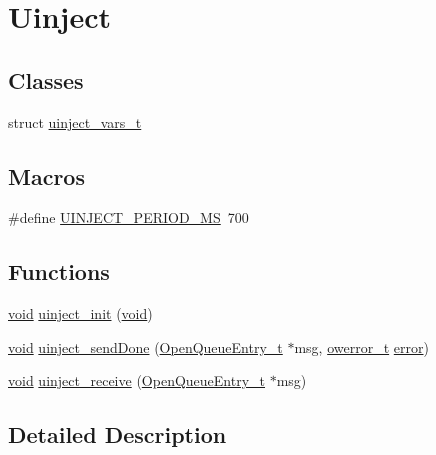 \hypertarget{group__uinject}{}\section{Uinject}
\label{group__uinject}
\subsection*{Classes}
\begin{DoxyCompactItemize}
\item 
struct \hyperlink{structuinject__vars__t}{uinject\+\_\+vars\+\_\+t}
\end{DoxyCompactItemize}
\subsection*{Macros}
\begin{DoxyCompactItemize}
\item 
\#define \hyperlink{group__uinject_ga5b31a0d33a0be3a28d77fbdba9a3e2b7}{U\+I\+N\+J\+E\+C\+T\+\_\+\+P\+E\+R\+I\+O\+D\+\_\+\+MS}~700
\end{DoxyCompactItemize}
\subsection*{Functions}
\begin{DoxyCompactItemize}
\item 
\hyperlink{usb__devapi_8h_afabf60e7f57651d6d595a02c75f07cd0}{void} \hyperlink{group__uinject_gac6dcaebf6fba84d30d183c304c65040e}{uinject\+\_\+init} (\hyperlink{usb__devapi_8h_afabf60e7f57651d6d595a02c75f07cd0}{void})
\item 
\hyperlink{usb__devapi_8h_afabf60e7f57651d6d595a02c75f07cd0}{void} \hyperlink{group__uinject_gacd746c671f588346d03cd1fcf3d9d1b7}{uinject\+\_\+send\+Done} (\hyperlink{struct_open_queue_entry__t}{Open\+Queue\+Entry\+\_\+t} $\ast$msg, \hyperlink{opendefs_8h_af20b7c3ed9d2ba19e56a309ad9314803}{owerror\+\_\+t} \hyperlink{disk_8c_ad018a3100b2dabad325a0800152db297}{error})
\item 
\hyperlink{usb__devapi_8h_afabf60e7f57651d6d595a02c75f07cd0}{void} \hyperlink{group__uinject_gab4b19f3980fe96992594b407e7a78752}{uinject\+\_\+receive} (\hyperlink{struct_open_queue_entry__t}{Open\+Queue\+Entry\+\_\+t} $\ast$msg)
\end{DoxyCompactItemize}


\subsection{Detailed Description}


